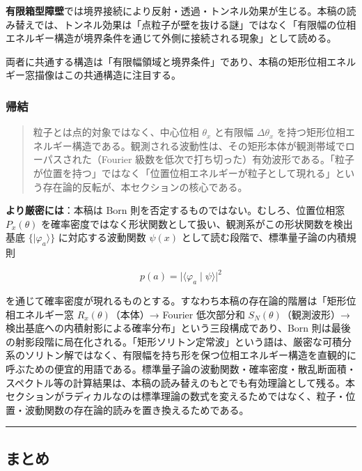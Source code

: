 \documentclass[
]{ltjsarticle}
\begin{document}
\textbf{有限箱型障壁}では境界接続により反射・透過・トンネル効果が生じる。本稿の読み替えでは、トンネル効果は「点粒子が壁を抜ける謎」ではなく「有限幅の位相エネルギー構造が境界条件を通じて外側に接続される現象」として読める。

両者に共通する構造は「有限幅領域と境界条件」であり、本稿の矩形位相エネルギー窓描像はこの共通構造に注目する。

\subsubsection{帰結}\label{ux5e30ux7d50-6}

\begin{quote}
粒子とは点的対象ではなく、中心位相 \(\theta_x\) と有限幅
\(\Delta\theta_x\)
を持つ矩形位相エネルギー構造である。観測される波動性は、その矩形本体が観測帯域でローパスされた（Fourier
級数を低次で打ち切った）有効波形である。「粒子が位置を持つ」ではなく「位置位相エネルギーが粒子として現れる」という存在論的反転が、本セクションの核心である。
\end{quote}

\textbf{より厳密には}：本稿は Born
則を否定するものではない。むしろ、位置位相窓 \(P_x(\theta)\)
を確率密度ではなく形状関数として扱い、観測系がこの形状関数を検出基底
\(\{|\varphi_a\rangle\}\) に対応する波動関数 \(\psi(x)\)
として読む段階で、標準量子論の内積規則

\[
p(a) = \lvert\langle \varphi_a \mid \psi \rangle\rvert^2
\]

を通じて確率密度が現れるものとする。すなわち本稿の存在論的階層は「矩形位相エネルギー窓
\(R_x(\theta)\)（本体）→ Fourier 低次部分和 \(S_N(\theta)\)（観測波形）→
検出基底への内積射影による確率分布」という三段構成であり、Born
則は最後の射影段階に局在化される。「矩形ソリトン定常波」という語は、厳密な可積分系のソリトン解ではなく、有限幅を持ち形を保つ位相エネルギー構造を直観的に呼ぶための便宜的用語である。標準量子論の波動関数・確率密度・散乱断面積・スペクトル等の計算結果は、本稿の読み替えのもとでも有効理論として残る。本セクションがラディカルなのは標準理論の数式を変えるためではなく、粒子・位置・波動関数の存在論的読みを置き換えるためである。

\begin{center}\rule{0.5\linewidth}{0.5pt}\end{center}

\subsection{まとめ}\label{ux307eux3068ux3081}
\end{document}
